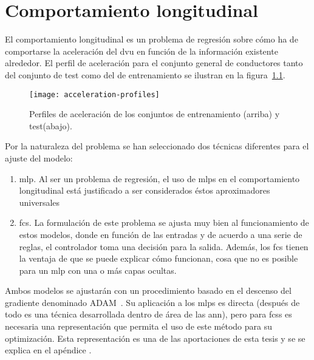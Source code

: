 \chapter{Comportamiento longitudinal}
\label{ch:longitudinal-model}

El comportamiento longitudinal es un problema de regresión sobre cómo ha de comportarse la aceleración del \ac{dvu} en función de la información existente alrededor. El perfil de aceleración para el conjunto general de conductores tanto del conjunto de test como del de entrenamiento se ilustran en la figura~\ref{fig:acceleration-profiles}.

\begin{figure}[!b]
	\centering
	\texttt{[image: acceleration-profiles]}
	\caption[Perfiles de aceleración a ajustar por los modelos. Conjuntos de entrenamiento y de test]{Perfiles de aceleración de los conjuntos de entrenamiento (arriba) y test(abajo).}
	\label{fig:acceleration-profiles}
\end{figure}

Por la naturaleza del problema se han seleccionado dos técnicas diferentes para el ajuste del modelo:

\begin{enumerate}
	\item \ac{mlp}. Al ser un problema de regresión, el uso de \acp{mlp} en el comportamiento longitudinal está justificado a ser considerados éstos aproximadores universales~\cite{hornik1991approximation}
	\item \ac{fcs}. La formulación de este problema se ajusta muy bien al funcionamiento de estos modelos, donde en función de las entradas y de acuerdo a una serie de reglas, el controlador toma una decisión para la salida. Además, los \ac{fcs} tienen la ventaja de que se puede explicar cómo funcionan, cosa que no es posible para un \ac{mlp} con una o más capas ocultas.
\end{enumerate}

Ambos modelos se ajustarán con un procedimiento basado en el descenso del gradiente denominado ADAM~\cite{kingma2014adam}. Su aplicación a los \acp{mlp} es directa (después de todo es una técnica desarrollada dentro de área de las \gls{ann}), pero para \acp{fcs} es necesaria una representación que permita el uso de este método para su optimización. Esta representación es una de las aportaciones de esta tesis y se se explica en el apéndice .

